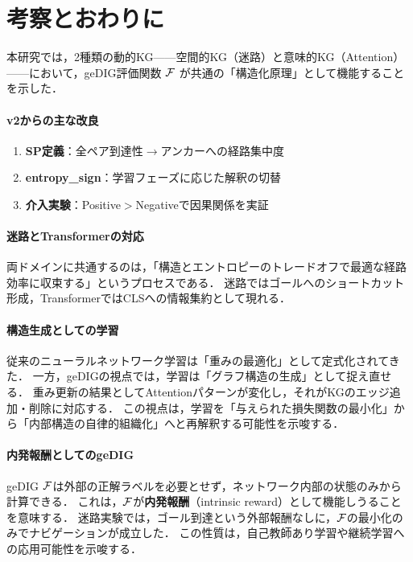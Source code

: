\section{考察とおわりに}

本研究では，2種類の動的KG——空間的KG（迷路）と意味的KG（Attention）——において，geDIG評価関数 $\mathcal{F}$ が共通の「構造化原理」として機能することを示した．

\paragraph{v2からの主な改良}
\begin{enumerate}
    \item \textbf{SP定義}：全ペア到達性$\to$アンカーへの経路集中度
    \item \textbf{entropy\_sign}：学習フェーズに応じた解釈の切替
    \item \textbf{介入実験}：Positive$>$Negativeで因果関係を実証
\end{enumerate}

\paragraph{迷路とTransformerの対応}
両ドメインに共通するのは，「構造とエントロピーのトレードオフで最適な経路効率に収束する」というプロセスである．
迷路ではゴールへのショートカット形成，TransformerではCLSへの情報集約として現れる．

\paragraph{構造生成としての学習}
従来のニューラルネットワーク学習は「重みの最適化」として定式化されてきた．
一方，geDIGの視点では，学習は「グラフ構造の生成」として捉え直せる．
重み更新の結果としてAttentionパターンが変化し，それがKGのエッジ追加・削除に対応する．
この視点は，学習を「与えられた損失関数の最小化」から「内部構造の自律的組織化」へと再解釈する可能性を示唆する．

\paragraph{内発報酬としてのgeDIG}
geDIG $\mathcal{F}$は外部の正解ラベルを必要とせず，ネットワーク内部の状態のみから計算できる．
これは，$\mathcal{F}$が\textbf{内発報酬}（intrinsic reward）として機能しうることを意味する．
迷路実験では，ゴール到達という外部報酬なしに，$\mathcal{F}$の最小化のみでナビゲーションが成立した．
この性質は，自己教師あり学習や継続学習への応用可能性を示唆する．

